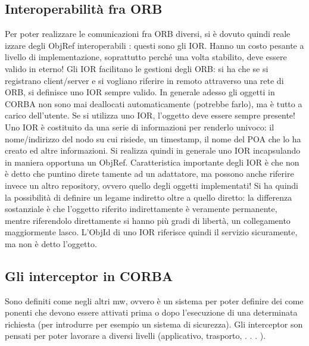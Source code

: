 \subsection{Interoperabilità fra ORB}
Per poter realizzare le comunicazioni fra ORB diversi, si è dovuto quindi reale
izzare degli ObjRef interoperabili : questi sono gli IOR. Hanno un costo pesante
a livello di implementazione, soprattutto perché una volta stabilito, deve essere
valido in eterno!
Gli IOR facilitano le gestioni degli ORB: si ha che se si registrano client/server
e si vogliano riferire in remoto attraverso una rete di ORB, si definisce uno IOR
sempre valido. In generale adesso gli oggetti in CORBA non sono mai deallocati
automaticamente (potrebbe farlo), ma è tutto a carico dell'utente. Se si utilizza uno IOR, l'oggetto deve essere
sempre presente!
Uno IOR è costituito da una serie di informazioni per renderlo univoco: il nome/indirizzo del nodo su cui risiede, un
timestamp, il nome del POA che lo ha
creato ed altre informazioni. Si realizza quindi in generale uno IOR incapsulando
in maniera opportuna un ObjRef.
Caratteristica importante degli IOR è che non è detto che puntino direte
tamente ad un adattatore, ma possono anche riferire invece un altro repository, ovvero quello degli oggetti
implementati! Si ha quindi la possibilità di
definire un legame indiretto oltre a quello diretto: la differenza sostanziale è che l'oggetto riferito indirettamente è
veramente permanente, mentre riferendolo direttamente si hanno più gradi di libertà, un collegamento maggiormente
lasco. L'ObjId di uno IOR riferisce quindi il servizio sicuramente, ma non è detto l'oggetto.
\subsection{Gli interceptor in CORBA}
Sono definiti come negli altri mw, ovvero è un sistema per poter definire dei come
ponenti che devono essere attivati prima o dopo l'esecuzione di una determinata
richiesta (per introdurre per esempio un sistema di sicurezza). Gli interceptor
son pensati per poter lavorare a diversi livelli (applicativo, trasporto, . . . ).
